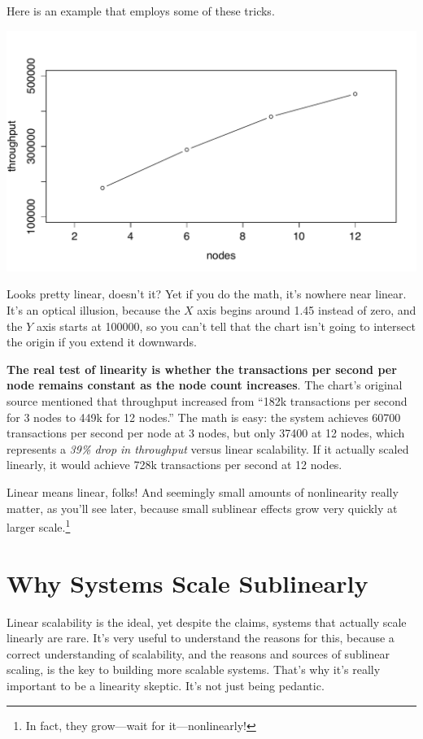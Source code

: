 \documentclass{vivid_layout}
\begin{document}
Here is an example that employs some of these tricks.
\begin{center}
\includegraphics[width=.85\linewidth]{scalability/voltdb1}
\end{center}
Looks pretty linear, doesn't it? Yet if you do the math, it's nowhere near
linear.  It's an optical illusion, because the $X$ axis begins around
1.45 instead of zero, and the $Y$ axis starts at 100000, so you can't tell that
the chart isn't going to intersect the origin if you extend it downwards.

{\bfseries The real test of linearity is whether the transactions per second per
node remains constant as the node count increases}. The chart's original source
mentioned that throughput increased from ``182k transactions per second for 3
nodes to 449k for 12 nodes.'' The math is easy: the system achieves 60700
transactions per second per node at 3 nodes, but only 37400 at 12 nodes, which
represents a {\itshape 39\% drop in throughput} versus linear scalability.  If
it actually scaled linearly, it would achieve 728k transactions per second at 12
nodes.

Linear means linear, folks! And seemingly small amounts of nonlinearity really
matter, as you'll see later, because small sublinear effects grow very quickly
at larger scale.\footnote{In fact, they grow---wait for it---nonlinearly!}

\section{Why Systems Scale Sublinearly}

Linear scalability is the ideal, yet despite the claims, systems that actually
scale linearly are rare.  It's very useful to understand the reasons for this,
because a correct understanding of scalability, and the reasons and sources of
sublinear scaling, is the key to building more scalable systems.  That's why
it's really important to be a linearity skeptic.  It's not just being pedantic.
\end{document}
